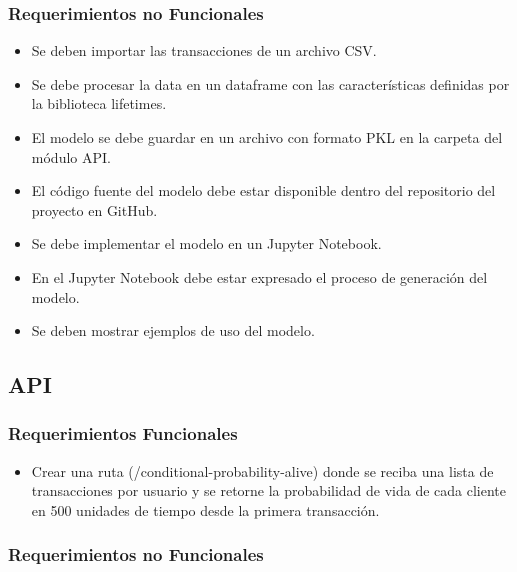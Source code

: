 \subsubsection{Requerimientos no Funcionales}

\begin{itemize}
	\item Se deben importar las transacciones de un archivo CSV.
	\item Se debe procesar la data en un dataframe con las características definidas por la biblioteca lifetimes.
	\item El modelo se debe guardar en un archivo con formato PKL en la carpeta del módulo API.
	\item El código fuente del modelo debe estar disponible dentro del repositorio del proyecto en GitHub.
	\item Se debe implementar el modelo en un Jupyter Notebook.
	\item En el Jupyter Notebook debe estar expresado el proceso de generación del modelo.
	\item Se deben mostrar ejemplos de uso del modelo.
\end{itemize}

\subsection{API}

\subsubsection{Requerimientos Funcionales}

\begin{itemize}
	\item Crear una ruta (/conditional-probability-alive) donde se reciba una lista de transacciones por usuario y se retorne la probabilidad de vida de cada cliente en 500 unidades de tiempo desde la primera transacción.
\end{itemize}

\subsubsection{Requerimientos no Funcionales}

